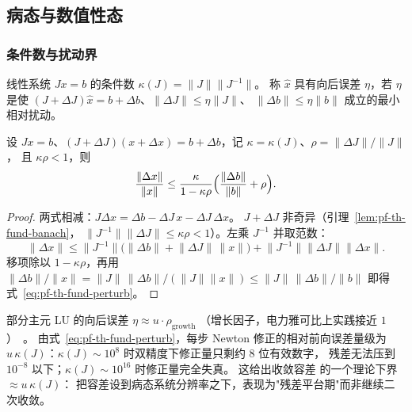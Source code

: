 \subsection{病态与数值性态}\label{sec:pf-th-fund-conditioning}

\subsubsection{条件数与扰动界}

\begin{definition}[条件数与向后误差]\label{def:pf-th-fund-cond}
线性系统 $Jx=b$ 的条件数 $\kappa(J)=\lVert J\rVert\lVert J^{-1}\rVert$。
称 $\hat x$ 具有向后误差 $\eta$，若 $\eta$ 是使
$(J+\Delta J)\hat x=b+\Delta b$、$\lVert\Delta J\rVert\le\eta\lVert J\rVert$、
$\lVert\Delta b\rVert\le\eta\lVert b\rVert$ 成立的最小相对扰动。
\end{definition}

\begin{theorem}[线性系统扰动界]\label{thm:pf-th-fund-perturb}
设 $Jx=b$、$(J+\Delta J)(x+\Delta x)=b+\Delta b$，记
$\kappa=\kappa(J)$、$\rho=\lVert\Delta J\rVert/\lVert J\rVert$，
且 $\kappa\rho<1$，则
\begin{equation}
\frac{\lVert\Delta x\rVert}{\lVert x\rVert}
\le\frac{\kappa}{1-\kappa\rho}
\Bigl(\frac{\lVert\Delta b\rVert}{\lVert b\rVert}+\rho\Bigr).
\label{eq:pf-th-fund-perturb}
\end{equation}
\end{theorem}

\begin{proof}
两式相减：$J\Delta x=\Delta b-\Delta J\,x-\Delta J\,\Delta x$。
$J+\Delta J$ 非奇异（引理~\ref{lem:pf-th-fund-banach}，
$\lVert J^{-1}\rVert\lVert\Delta J\rVert\le\kappa\rho<1$）。左乘 $J^{-1}$
并取范数：
\begin{equation}
\lVert\Delta x\rVert
\le\lVert J^{-1}\rVert\bigl(\lVert\Delta b\rVert+\lVert\Delta J\rVert\,
\lVert x\rVert\bigr)+\lVert J^{-1}\rVert\lVert\Delta J\rVert\lVert\Delta x\rVert .
\end{equation}
移项除以 $1-\kappa\rho$，再用
$\lVert\Delta b\rVert/\lVert x\rVert
=\lVert J\rVert\,\lVert\Delta b\rVert/(\lVert J\rVert\lVert x\rVert)
\le\lVert J\rVert\,\lVert\Delta b\rVert/\lVert b\rVert$
即得式~\eqref{eq:pf-th-fund-perturb}。
\end{proof}

\begin{remark}[浮点含义与潮流量级]\label{rem:pf-th-fund-float}
部分主元 LU 的向后误差 $\eta\approx u\cdot\rho_{\mathrm{growth}}$
（增长因子，电力雅可比上实践接近 $1$）~\cite{pff:golub-vanloan}。
由式~\eqref{eq:pf-th-fund-perturb}，每步 Newton 修正的相对前向误差量级为
$u\,\kappa(J)$：$\kappa(J)\sim10^{8}$ 时双精度下修正量只剩约 8 位有效数字，
残差无法压到 $10^{-8}$ 以下；$\kappa(J)\sim10^{16}$ 时修正量完全失真。
这给出收敛容差  的一个理论下界 $\approx u\,\kappa(J)$：
把容差设到病态系统分辨率之下，表现为"残差平台期"而非继续二次收敛。
\end{remark}

